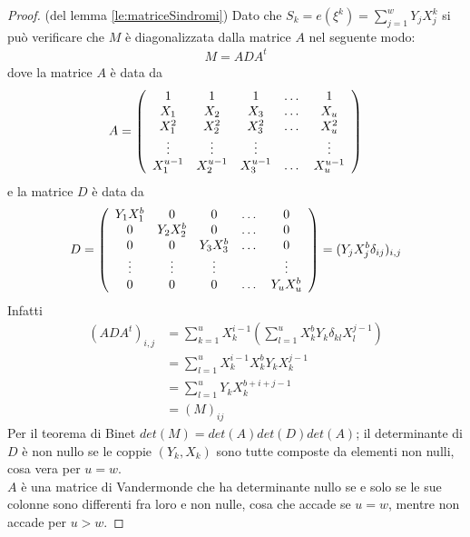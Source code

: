 \begin{proof}(del lemma \ref{le:matriceSindromi})
   Dato che $S_{k} = e(\xi^{k}) = \sum_{j=1}^{w}Y_{j}X_{j}^{k}$ si può verificare che $M$ è diagonalizzata dalla matrice $A$ nel seguente modo:
   \begin{align*}
      M = ADA^{t}
   \end{align*}
   dove la matrice $A$ è data da
   \begin{align*}
      A =
 	\left(
 	\begin{array} {c c c c c}
 	1 & 1 & 1 & \dots & 1   \\
        X_{1} & X_{2} & X_{3} & \dots & X_{u}   \\
        X_{1}^{2} & X_{2}^{2} & X_{3}^{2} & \dots & X_{u}^{2}   \\
        \vdots & \vdots & \vdots &  & \vdots   \\
        X_{1}^{u-1} & X_{2}^{u-1} & X_{3}^{u-1} & \dots & X_{u}^{u-1}
 	\end{array}
 	\right)
   \end{align*}
   e la matrice $D$ è data da
   \begin{align*}
      D =
 	\left(
 	\begin{array} {c c c c c}
 	Y_{1}X_{1}^{b} & 0 & 0 & \dots & 0   \\
        0 & Y_{2}X_{2}^{b} & 0 & \dots & 0   \\
        0 & 0 & Y_{3}X_{3}^{b} & \dots & 0   \\
        \vdots & \vdots & \vdots &  & \vdots   \\
        0 & 0 & 0 & \dots & Y_{u}X_{u}^{b}
 	\end{array}
 	\right)
 	=
 	(Y_{j}X_{j}^{b} \delta_{ij})_{i,j}
   \end{align*}
   Infatti
   \begin{align*}
       (ADA^{t})_{i,j} &= \sum_{k=1}^{u} X_{k}^{i-1} (\sum_{l=1}^{u} X_{k}^{b} Y_{k} \delta_{kl} X_{l}^{j-1} ) \\
                       &= \sum_{l=1}^{u} X_{k}^{i-1} X_{k}^{b} Y_{k} X_{k}^{j-1} \\
                       &= \sum_{l=1}^{u} Y_{k} X_{k}^{b+i+j-1} \\
                       &= (M)_{ij}
   \end{align*}
   Per il teorema di Binet $det(M) = det(A)det(D)det(A)$; il determinante di $D$ è non nullo se le coppie  $(Y_{k},X_{k})$ sono tutte composte da elementi non nulli, cosa vera per $u=w$.\\
   $A$ è una matrice di Vandermonde che ha determinante nullo se e solo se le sue colonne sono differenti fra loro e non nulle, cosa che accade se $u=w$, mentre non accade per $u > w$.
\end{proof}

